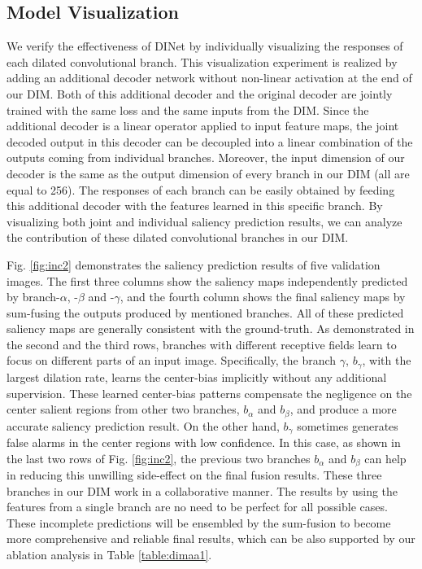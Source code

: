 \subsection{Model Visualization}
 We verify the effectiveness of DINet by individually visualizing the responses of each dilated convolutional branch. This visualization experiment is realized by adding an additional decoder network without non-linear activation at the end of our DIM. Both of this additional decoder and the original decoder are jointly trained with the same loss and the same inputs from the DIM. Since the additional decoder is a linear operator applied to input feature maps, the joint decoded output in this decoder can be decoupled into a linear combination of the outputs coming from individual branches. Moreover, the input dimension of our decoder is the same as the output dimension of every branch in our DIM (all are equal to 256). The responses of each branch can be easily obtained by feeding this additional decoder with the features learned in this specific branch. By visualizing both joint and individual saliency prediction results, we can analyze the contribution of these dilated convolutional branches in our DIM.








	Fig. \ref{fig:inc2} demonstrates the saliency prediction results of five validation images. The first three columns show the saliency maps independently predicted by branch-$\alpha$, -$\beta$ and -$\gamma$, and the fourth column shows the final saliency maps by sum-fusing the outputs produced by mentioned branches. All of these predicted saliency maps are generally consistent with the ground-truth. As demonstrated in the second and the third rows, branches with different receptive fields learn to focus on different parts of an input image. Specifically, the branch $\gamma$, \ie $b_\gamma$, with the largest dilation rate, learns the center-bias implicitly without any additional supervision. These learned center-bias patterns compensate the negligence on the center salient regions from other two branches, $b_\alpha$ and $b_\beta$, and produce a more accurate saliency prediction result. On the other hand, $b_\gamma$ sometimes generates false alarms in the center regions with low confidence. In this case, as shown in the last two rows of Fig. \ref{fig:inc2}, the previous two branches $b_\alpha$ and $b_\beta$ can help in reducing this unwilling side-effect on the final fusion results. These three branches in our DIM work in a collaborative manner. The results by using the features from a single branch are no need to be perfect for all possible cases. These incomplete predictions will be ensembled by the sum-fusion to become more comprehensive and reliable final results, which can be also supported by our ablation analysis in Table \ref{table:dimaa1}.






